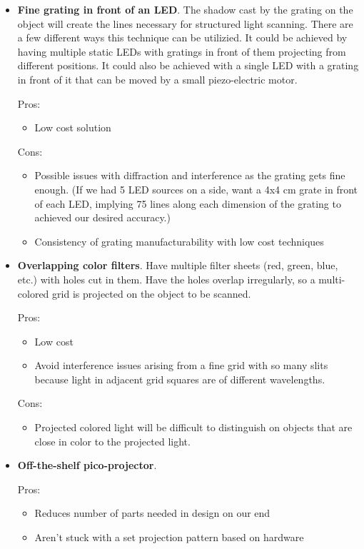 \documentclass[10pt]{article}
\begin{document}
\begin{itemize}
\item \textbf{Fine grating in front of an LED}. The shadow cast by the grating on the
  object will create the lines necessary for structured light scanning. There are a few different ways this technique can be utilizied. It
  could be achieved by having multiple static LEDs with gratings in front of
  them projecting from different positions.  It could also be achieved with a single LED with a grating in front of it that can be moved by a small piezo-electric motor.
  
  Pros:
  \begin{itemize}
  \item Low cost solution
  \end{itemize}

  Cons:
  \begin{itemize}
  \item Possible issues with diffraction and interference as the grating gets fine enough. (If we had 5 LED sources on a side, want a 4x4 cm grate in front of each LED, implying 75 lines along each dimension of the grating to achieved our desired accuracy.)
  \item Consistency of grating manufacturability with low cost techniques
  \end{itemize}

\item \textbf{Overlapping color filters}. Have multiple filter sheets (red, green, blue, etc.) with holes cut in them. Have the holes overlap irregularly, so a multi-colored grid is projected on the object to be scanned.

Pros:
\begin{itemize}
\item Low cost
\item Avoid interference issues arising from a fine grid with so many slits because light in adjacent grid squares are of different wavelengths.
\end{itemize}

Cons:
\begin{itemize}
\item Projected colored light will be difficult to distinguish on objects that are close in color to the projected light.
\end{itemize}

\item \textbf{Off-the-shelf pico-projector}. 

Pros:
\begin{itemize}
\item Reduces number of parts needed in design on our end
\item Aren't stuck with a set projection pattern based on hardware
\end{itemize}


\end{itemize}
\end{document}
